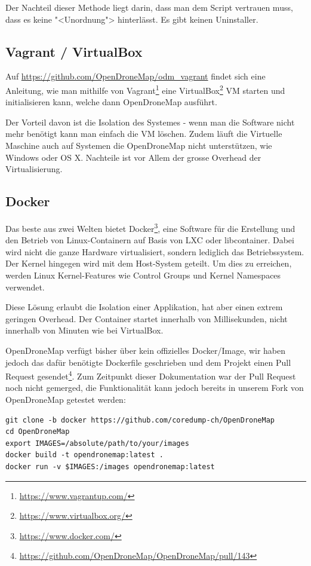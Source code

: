 \noindent Der Nachteil dieser Methode liegt darin, dass man dem Script vertrauen
muss, dass es keine "<Unordnung"> hinterlässt. Es gibt keinen Uninstaller.

\subsection{Vagrant / VirtualBox}

Auf \url{https://github.com/OpenDroneMap/odm_vagrant} findet sich eine
Anleitung, wie man mithilfe von
Vagrant\footnote{\url{https://www.vagrantup.com/}} eine
VirtualBox\footnote{\url{https://www.virtualbox.org/}} VM starten und
initialisieren kann, welche dann OpenDroneMap ausführt.

Der Vorteil davon ist die Isolation des Systemes - wenn man die Software nicht
mehr benötigt kann man einfach die VM löschen. Zudem läuft die Virtuelle
Maschine auch auf Systemen die OpenDroneMap nicht unterstützen, wie Windows oder
OS X. Nachteile ist vor Allem der grosse Overhead der Virtualisierung.

\subsection{Docker}

Das beste aus zwei Welten bietet Docker\footnote{\url{https://www.docker.com/}},
eine Software für die Erstellung und den Betrieb von Linux-Containern auf Basis
von LXC oder libcontainer. Dabei wird nicht die ganze Hardware virtualisiert,
sondern lediglich das Betriebssystem. Der Kernel hingegen wird mit dem
Host-System geteilt. Um dies zu erreichen, werden Linux Kernel-Features wie
Control Groups und Kernel Namespaces verwendet.

Diese Lösung erlaubt die Isolation einer Applikation, hat aber einen extrem
geringen Overhead. Der Container startet innerhalb von Millisekunden, nicht
innerhalb von Minuten wie bei VirtualBox.

OpenDroneMap verfügt bisher über kein offizielles Docker\-/Image, wir haben
jedoch das dafür benötigte Dockerfile geschrieben und dem Projekt einen Pull
Request
gesendet\footnote{\url{https://github.com/OpenDroneMap/OpenDroneMap/pull/143}}.
Zum Zeitpunkt dieser Dokumentation war der Pull Request noch nicht gemerged, die
Funktionalität kann jedoch bereits in unserem Fork von OpenDroneMap getestet
werden:

\vspace{0.5\baselineskip}
\begin{verbatim} 
git clone -b docker https://github.com/coredump-ch/OpenDroneMap
cd OpenDroneMap
export IMAGES=/absolute/path/to/your/images
docker build -t opendronemap:latest .
docker run -v $IMAGES:/images opendronemap:latest
\end{verbatim}

